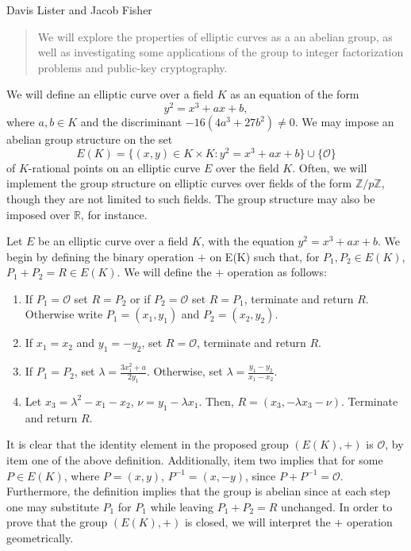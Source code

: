 \documentclass{article}
\begin{document}
Davis Lister and Jacob Fisher

\begin{abstract}
We will explore the properties of elliptic curves as a an abelian group, as well as investigating some applications of the group to integer factorization problems and public-key cryptography.
\end{abstract}

We will define an elliptic curve over a field $K$ as an equation of the form 
$$y^2=x^3+ax+b,$$ 
where $a,b \in K$ and the discriminant $-16(4a^3+27b^2) \neq 0$. We may impose an abelian group structure on the set
$$E(K)=\lbrace(x,y) \in K \times K: y^2=x^3+ax+b\rbrace \cup \lbrace \mathcal{O} \rbrace$$
of $K$-rational points on an elliptic curve $E$ over the field $K$. Often, we will implement the group structure on elliptic curves over fields of the form $\mathbb{Z}/p\mathbb{Z}$, though they are not limited to such fields. The group structure may also be imposed over $\mathbb{R}$, for instance.

\indent Let $E$ be an elliptic curve over a field $K$, with the equation $y^2=x^3+ax+b$. We begin by defining the binary operation $+$ on E(K) such that, for $P_1,P_2 \in E(K)$, $P_1 + P_2=R \in E(K)$.  We will define the $+$ operation as follows:

\begin{enumerate}
\item If $P_1=\mathcal{O}$ set $R=P_2$ or if $P_2=\mathcal{O}$ set $R=P_1$, terminate and return $R$. Otherwise write $P_1=(x_1,y_1)$ and $P_2=(x_2,y_2)$.
\item If $x_1=x_2$ and $y_1=-y_2$, set $R=\mathcal{O}$, terminate and return $R$.
\item If $P_1=P_2$, set $\lambda=\frac{3x_1^2+a}{2y_1}$. Otherwise, set $\lambda=\frac{y_1-y_2}{x_1-x_2}$.
\item Let $x_3=\lambda^2-x_1-x_2$, $\nu=y_1-\lambda x_1$. Then, $R=(x_3,-\lambda x_3-\nu)$. Terminate and return $R$.
\end{enumerate} 

\indent It is clear that the identity element in the proposed group $(E(K),+)$ is $\mathcal{O}$, by item one of the above definition. Additionally, item two implies that for some $P \in E(K)$, where $P=(x,y)$, $P^{-1}=(x,-y)$, since $P+P^{-1}=\mathcal{O}$. Furthermore, the definition implies that the group is abelian since at each step one may substitute $P_1$ for $P_1$ while leaving $P_1+P_2=R$ unchanged. In order to prove that the group $(E(K),+)$ is closed, we will interpret the $+$ operation geometrically.
\end{document}
